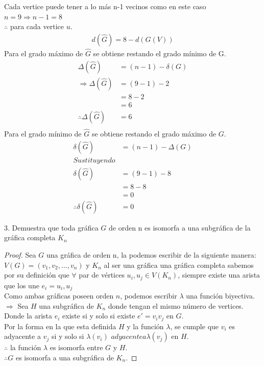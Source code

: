 \documentclass{article}
\begin{document}
\begin{justify}
{\begin{itemize}
     Cada vertice puede tener a lo más n-1 vecinos como en este caso $n = 9 \Longrightarrow n-1 = 8 $ \\
     $\therefore$ para cada vertice $u$. \\
     \begin{align}
       d(\hat{G}) = 8 - d(G(V))
     \end{align}
     Para el grado máximo de $\hat{G}$ se obtiene restando el grado mínimo de G.
     \begin{align}
       \Delta(\hat{G}) &= (n-1) - \delta(G) \\
       \Longrightarrow \Delta(\hat{G}) &= (9-1) - 2\\
       &= 8-2\\
       &= 6\\
         \therefore \Delta(\hat{G}) &= 6\\
     \end{align}
     Para el grado mínimo de $\hat{G}$ se obtiene restando el grado máximo de $G$. \\
     \begin{align}
       \delta(\hat{G}) &= (n-1) - \Delta(G) \\
       Sustituyendo \\
       \delta(\hat{G}) &= (9-1) - 8\\
                       &= 8-8 \\
                       &=0 \\
       \therefore \delta(\hat{G}) &= 0
     \end{align}
    \end{itemize}
    }
  \end{justify} %
  \begin{justify} %
    3. Demuestra que toda gráfica $G$ de orden n es isomorfa a una subgráfica de la gráfica completa $K_n$
    \begin{proof}
      Sea $G$ una gráfica de orden n, la podemos escribir de la siguiente manera: $V(G) = (v_1, v_2, ..., v_n) $ y $K_n$ al ser una gráfica
      una gráfica completa sabemos por su definición que $\forall$ par de vértices $u_i,u_j \in V(K_n)$, siempre existe una arista que los une
      $ e_i = u_i, u_j$ \\
      Como ambas gráficas poseen orden $n$, podemos escribir $\lambda$ una función biyectiva. \\
      $\Longrightarrow $ Sea $H$ una subgráfica de $K_n$ donde tengan el mismo número de vertices. 
      Donde la arista $e_i $ existe si y solo si existe $e\prime = v_i v_j $ en $G$. \\
      Por la forma en la que esta definida $H$ y la función $\lambda$, se cumple que $v_i$ es adyacente a $v_j$ si y solo si $\lambda(v_i)$
      $adyacente a \lambda(v_j)$ en $H$.\\
      $\therefore$ la función $\lambda$ es isomorfa entre $G$ y $H$. \\
      $\therefore G$ es isomorfa a una subgráfica de $K_n$. 
    \end{proof}
  \end{justify} %
\end{document}
